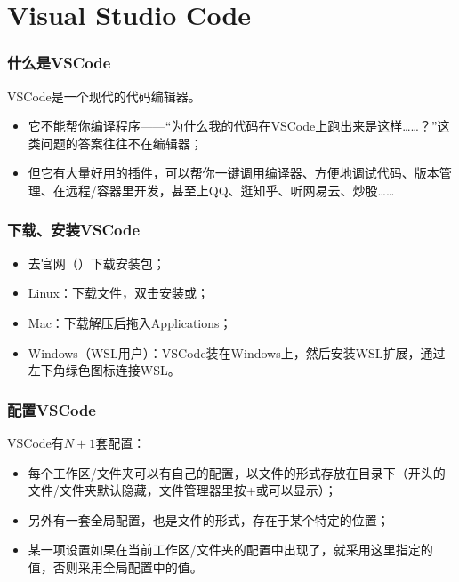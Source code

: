 \section{Visual Studio Code}

\begin{frame}
    \frametitle{什么是VSCode}
    VSCode是一个现代的\alert{代码编辑器}。
    \begin{itemize}
        \item 它不能帮你\alert{编译}程序——“为什么我的代码在VSCode上跑出来是这样……？”这类问题的答案往往不在编辑器；
        \item 但它有大量好用的插件，可以帮你一键调用编译器、方便地调试代码、版本管理、在远程/容器里开发，甚至上QQ、逛知乎、听网易云、炒股……
    \end{itemize}
\end{frame}

\begin{frame}
    \frametitle{下载、安装VSCode}
    \begin{itemize}
        \item 去官网（）下载安装包；
        \item \alert{Linux}：下载文件，双击安装或；
        \item \alert{Mac}：下载解压后拖入Applications；
        \item \alert{Windows（WSL用户）}：VSCode装在Windows上，然后安装\alert{WSL}扩展，通过左下角绿色图标连接WSL。
    \end{itemize}
\end{frame}

\begin{frame}
    \frametitle{配置VSCode}
    VSCode有$N+1$套配置：
    \begin{itemize}
        \item 每个工作区/文件夹可以有自己的配置，以文件的形式存放在目录下（开头的文件/文件夹默认隐藏，文件管理器里按+或可以显示）；
        \item 另外有一套全局配置，也是文件的形式，存在于某个特定的位置；
        \item 某一项设置如果在当前工作区/文件夹的配置中出现了，就采用这里指定的值，否则采用全局配置中的值。
    \end{itemize}
\end{frame}

